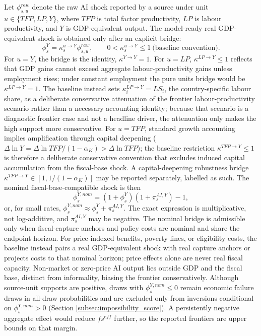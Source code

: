 \documentclass[11pt,a4paper]{article}
\begin{document}
Let $\phi^{raw}_{s,u}$ denote the raw AI shock reported by a source under unit $u\in\{TFP,LP,Y\}$, where $TFP$ is total factor productivity, $LP$ is labour productivity, and $Y$ is GDP-equivalent output. The model-ready real GDP-equivalent shock is obtained only after an explicit bridge:
\begin{equation}
    \phi^Y_s=\kappa^{u\to Y}_s\phi^{raw}_{s,u},\qquad 0<\kappa^{u\to Y}_s\leq 1\ \text{(baseline convention)}.
\end{equation}
For $u=Y$, the bridge is the identity, $\kappa^{Y\to Y}=1$. For $u=LP$, $\kappa^{LP\to Y}\leq1$ reflects that GDP gains cannot exceed aggregate labour-productivity gains unless employment rises; under constant employment the pure units bridge would be $\kappa^{LP\to Y}=1$. The baseline instead sets $\kappa^{LP\to Y}_i=LS_i$, the country-specific labour share, as a deliberate conservative attenuation of the frontier labour-productivity scenario rather than a necessary accounting identity; because that scenario is a diagnostic frontier case and not a headline driver, the attenuation only makes the high support more conservative. For $u=TFP$, standard growth accounting implies amplification through capital deepening ($\Delta\ln Y=\Delta\ln TFP/(1-\alpha_K)>\Delta\ln TFP$); the baseline restriction $\kappa^{TFP\to Y}\leq1$ is therefore a deliberate conservative convention that excludes induced capital accumulation from the fiscal-base shock. A capital-deepening robustness bridge $\kappa^{TFP\to Y}\in[1,1/(1-\alpha_K)]$ may be reported separately, labelled as such.
The nominal fiscal-base-compatible shock is then
\begin{equation}
    \phi^{Y,nom}_s=(1+\phi^Y_s)(1+\pi^{AI,Y}_s)-1,
\end{equation}
or, for small rates, $\phi^{Y,nom}_s\approx \phi^Y_s+\pi^{AI,Y}_s$. The exact expression is multiplicative, not log-additive, and $\pi^{AI,Y}_s$ may be negative. The nominal bridge is admissible only when fiscal-capture anchors and policy costs are nominal and share the endpoint horizon. For price-indexed benefits, poverty lines, or eligibility costs, the baseline instead pairs a real GDP-equivalent shock with real capture anchors or projects costs to that nominal horizon; price effects alone are never real fiscal capacity. Non-market or zero-price AI output lies outside GDP and the fiscal base, distinct from informality, biasing the frontier conservatively. Although source-unit supports are positive, draws with $\phi^{Y,nom}_s\leq0$ remain economic failure draws in all-draw probabilities and are excluded only from inversions conditional on $\phi^{Y,nom}_s>0$ (Section \ref{subsec:impossibility_score}). A persistently negative aggregate effect would reduce $fs^{eff}$ further, so the reported frontiers are upper bounds on that margin.
\end{document}
